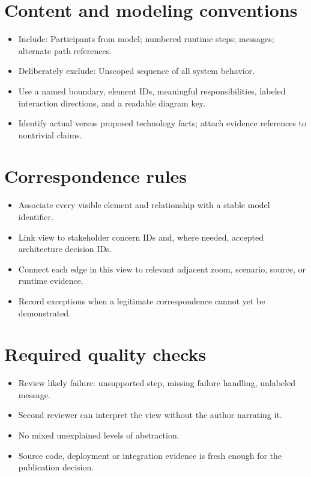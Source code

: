 \documentclass[10pt,letterpaper]{article}
\begin{document}
\section{Content and modeling conventions}
\begin{itemize}
\item Include: Participants from model; numbered runtime steps; messages; alternate path references.
\item Deliberately exclude: Unscoped sequence of all system behavior.
\item Use a named boundary, element IDs, meaningful responsibilities, labeled interaction directions, and a readable diagram key.
\item Identify actual versus proposed technology facts; attach evidence references to nontrivial claims.
\end{itemize}

\section{Correspondence rules}
\begin{itemize}
\item Associate every visible element and relationship with a stable model identifier.
\item Link view to stakeholder concern IDs and, where needed, accepted architecture decision IDs.
\item Connect each edge in this view to relevant adjacent zoom, scenario, source, or runtime evidence.
\item Record exceptions when a legitimate correspondence cannot yet be demonstrated.
\end{itemize}

\section{Required quality checks}
\begin{itemize}
\item Review likely failure: unsupported step, missing failure handling, unlabeled message.
\item Second reviewer can interpret the view without the author narrating it.
\item No mixed unexplained levels of abstraction.
\item Source code, deployment or integration evidence is fresh enough for the publication decision.
\end{itemize}
\end{document}
